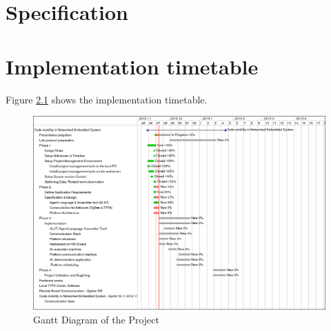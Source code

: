 \documentclass{scrreprt}
\begin{document}



\chapter {Specification}


\chapter{Implementation timetable}

Figure \ref{fig:ganttdiag} shows the implementation timetable.

\begin{figure}[!htbp]
\centering
\includegraphics[scale=0.4]{figures/gantt.png}
\caption{Gantt Diagram of the Project}
\label{fig:ganttdiag}
\end{figure}
\end{document}
